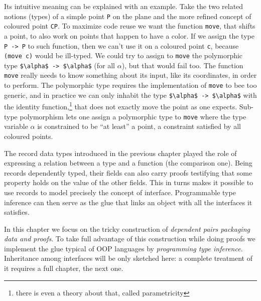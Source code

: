 Its intuitive meaning can be explained with an example.  Take the two
related notions (types) of a simple point \lstinline/P/ on the plane
and the more refined concept of coloured point \lstinline/CP/.  To
maximize code reuse we want the function \lstinline/move/, that shifts
a point, to also work on points that happen to have a color.
If we assign the type \lstinline/P -> P/ to such function, then we
can't use it on a coloured point \lstinline/c/, because
\lstinline/(move c)/ would be ill-typed.  
We could try to assign to \lstinline/move/ the polymorphic type
\lstinline/$\alpha$ -> $\alpha$/ (for all $\alpha$), but that would
fail too. The function \lstinline/move/ really needs to know something
about its input, like its coordinates, in order to perform.  The
polymorphic type requires the implementation of \lstinline/move/
to bee too generic, and
in practice we can only inhabit the type
\lstinline/$\alpha$ -> $\alpha$/ with the identity
function,\footnote{there is even a theory about that, called
parametricity} that does not exactly move the point as one expects.
Sub-type polymorphism lets one assign a polymorphic type to
\lstinline/move/ where the type variable $\alpha$ is constrained to be
``at least'' a point, a constraint satisfied by all coloured points.

The record data types introduced in the previous chapter played the
role of expressing a relation between a type and a function (the
comparison one).  Being records dependently typed, their fields can
also carry proofs testifying that some property holds on the value of
the other fields.  This in turns makes it possible to use records to
model precisely the concept of interface.  Programmable type inference
can then serve as the glue that links an object with all the
interfaces it satisfies. 

In this chapter we focus on the tricky construction of
\emph{dependent pairs packaging data and proofs}.  To take
full advantage of this construction while doing proofs we
implement the glue typical of OOP languages by \emph{programming
type inference}.
Inheritance among interfaces will be only sketched here: a complete
treatment of it requires a full chapter, the next one.

\mcbNOTES{}

